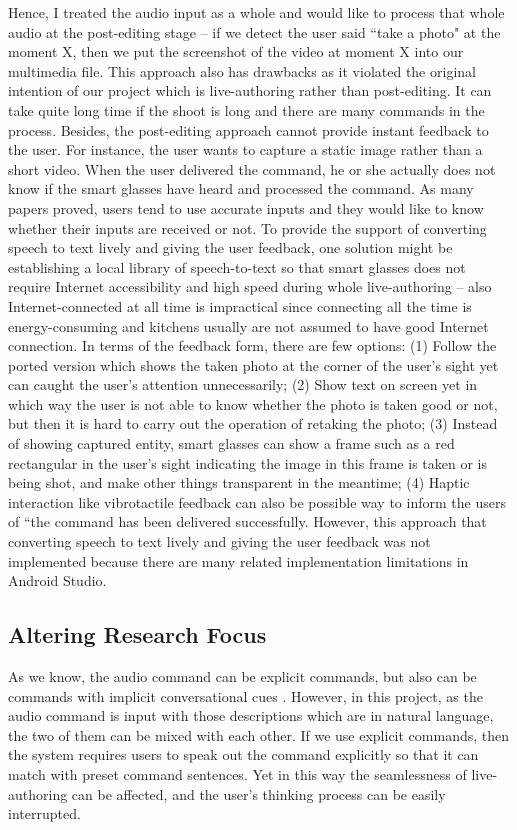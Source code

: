 \documentclass[fyp]{socreport}
\begin{document}
Hence, I treated the audio input as a whole and would like to process that whole audio at the post-editing stage -- if we detect the user said ``take a photo" at the moment X, then we put the screenshot of the video at moment X into our multimedia file. This approach also has drawbacks as it violated the original intention of our project which is live-authoring rather than post-editing. It can take quite long time if the shoot is long and there are many commands in the process. Besides, the post-editing approach cannot provide instant feedback to the user. For instance, the user wants to capture a static image rather than a short video. When the user delivered the command, he or she actually does not know if the smart glasses have heard and processed the command. As many papers proved, users tend to use accurate inputs and they would like to know whether their inputs are received or not. To provide the support of converting speech to text lively and giving the user feedback, one solution might be establishing a local library of speech-to-text so that smart glasses does not require Internet accessibility and high speed during whole live-authoring -- also Internet-connected at all time is impractical since connecting all the time is energy-consuming and kitchens usually are not assumed to have good Internet connection. In terms of the feedback form, there are few options: (1) Follow the ported version which shows the taken photo at the corner of the user's sight yet can caught the user's attention unnecessarily; (2) Show text on screen yet in which way the user is not able to know whether the photo is taken good or not, but then it is hard to carry out the operation of retaking the photo; (3) Instead of showing captured entity, smart glasses can show a frame such as a red rectangular in the user's sight indicating the image in this frame is taken or is being shot, and make other things transparent in the meantime; (4) Haptic interaction like vibrotactile feedback can also be possible way to inform the users of ``the command has been delivered successfully. However, this approach that converting speech to text lively and giving the user feedback was not implemented because there are many related implementation limitations in Android Studio. 

\subsection{Altering Research Focus}
As we know, the audio command can be explicit commands, but also can be commands with implicit conversational cues \cite{vtyurina2018exploring}. However, in this project, as the audio command is input with those descriptions which are in natural language, the two of them can be mixed with each other. If we use explicit commands, then the system requires users to speak out the command explicitly so that it can match with preset command sentences. Yet in this way the seamlessness of live-authoring can be affected, and the user's thinking process can be easily interrupted. 
\end{document}
